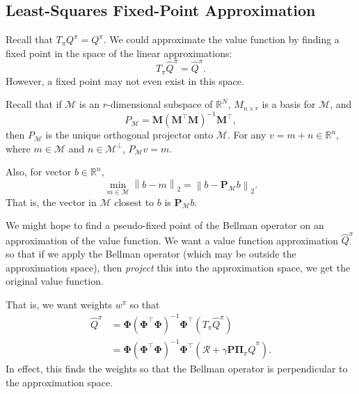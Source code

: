 \documentclass{article}
\newcommand{\R}{\mathbb{R}}
\newcommand{\norm}[1]{\left\|#1\right\|}
\begin{document}

\subsection*{Least-Squares Fixed-Point Approximation} %
\label{sub:least_squares_fixed_point_approximation}

Recall that $T_{\pi}Q^{\pi}=Q^{\pi}$. We could approximate the value function by finding a fixed point in the space of the linear approximations:
\[
	T_{\pi}\hat{Q}^{\pi}= \hat{Q}^{\pi}.
\]
However, a fixed point may not even exist in this space. 

Recall that if $\mathcal{M}$ is an $r$-dimensional subspace of $\R^{N}$, $M_{n\times r}$ is a basis for $\mathcal{M}$, and
\[
	P_{\mathcal{M}}=\mathbf{M}(\mathbf{M}^{\intercal}\mathbf{M})^{-1}\mathbf{M}^{\intercal},
\]
then $P_{\mathcal{M}}$ is the unique orthogonal projector onto $\mathcal{M}$. 
For any $v=m+n\in \R^{n}$, where $m\in \mathcal{M}$ and $n\in \mathcal{M}^{\perp}$, $P_{\mathcal{M}}v=m$.

Also, for vector $b\in \R^{n}$,
\[
	\min_{m\in \mathcal{M}}\norm{b-m}_{2}=\norm{b-\mathbf{P}_{\mathcal{M}}b}_{2}.
\]
That is, the vector in $\mathcal{M}$ closest to $b$ is $\mathbf{P}_{\mathcal{M}}b$.

We might hope to find a pseudo-fixed point of the Bellman operator on an approximation of the value function.
We want a value function approximation $\hat{Q}^{\pi}$ so that if we apply the Bellman operator (which may be outside the approximation space), then \emph{project} this into the approximation space, we get the original value function.

That is, we want weights $w^{\pi}$ so that
\begin{align}\nonumber
	\hat{Q}^{\pi}&=\mathbf{\Phi}(\mathbf{\Phi}^\intercal\mathbf{\Phi})^{-1}\mathbf{\Phi}^\intercal(T_{\pi}\hat{Q}^{\pi})\\
	&= \mathbf{\Phi}(\mathbf{\Phi}^\intercal\mathbf{\Phi})^{-1}\mathbf{\Phi}^\intercal
		(\mathcal{R}+\gamma \mathbf{P}\mathbf{\Pi}_{\pi}\hat{Q}^{\pi}).\label{eq:fixedpoint}
\end{align} 
In effect, this finds the weights so that the Bellman operator is perpendicular to the approximation space.
\end{document}

